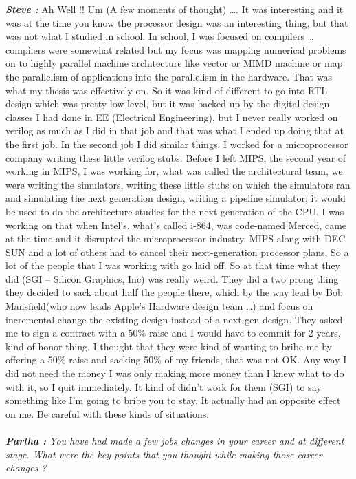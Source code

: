 \documentclass[a4paper, 12pt]{article}
\begin{document}
\begin{flushleft}
 	\textbf {\textit {Steve :}} Ah Well !! Um (A few moments of thought) \ldots. It was interesting and it was at the time you know the processor design was an interesting thing, but that was not what I studied in school. In school, I was focused on compilers \ldots compilers were somewhat related but my focus was mapping numerical problems on to highly parallel machine architecture like vector or MIMD machine or map the parallelism of applications into the parallelism in the hardware. That was what my thesis was effectively on. So it was kind of different to go into RTL design which was pretty low-level, but it was backed up by the digital design classes I had done in EE (Electrical Engineering), but I never really worked on verilog as much as I did in that job and that was what I ended up doing that at the first job. In the second job I did similar things. I worked for a microprocessor company writing these little verilog stubs. Before I left MIPS, the second year of working in MIPS, I was working for, what was called the architectural team, we were writing the simulators, writing these little stubs on which the simulators ran and simulating the next generation design, writing a pipeline simulator; it would be used to do the architecture studies for the next generation of the CPU. I was working on that when Intel's, what's called i-864, was code-named Merced, came at the time and it disrupted the microprocessor industry. MIPS along with DEC SUN and a lot of others had to cancel their next-generation processor plans, So a lot of the people that I was working with go laid off. So at that time what they did (SGI -- Silicon Graphics, Inc) was really weird. They did a two prong thing they decided to sack about half the people there, which by the way lead by Bob Mansfield(who now leads Apple’s Hardware design team \ldots) and focus on incremental change the existing design instead of a next-gen design. They asked me to sign a contract with a 50\% raise and I would have to commit for 2 years, kind of honor thing. I thought that they were kind of wanting to bribe me by offering a 50\% raise and sacking 50\% of my friends, that was not OK. Any way I did not need the money I was only making more money than I knew what to do with it, so I quit immediately. It kind of didn't work for them (SGI) to say something like  I'm going to bribe you to stay. It actually had an opposite effect on me. Be careful with these kinds of situations. \\~\\
	\textit {\textbf{Partha :} You have had made a few jobs changes in your career and at different stage. What were the key points that you thought while making those career changes ?} \\ 

\end{flushleft}
\end{document}
